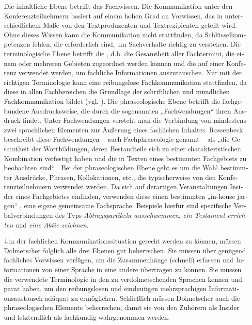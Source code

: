\documentclass[output=paper]{LSP/langsci}
\begin{document}
\begin{otherlanguage}{ngerman}
Die inhaltliche Ebene betrifft das Fachwissen. Die Kommunikation unter den Konferenzteilnehmern basiert auf einem hohen Grad an Vorwissen, das in unterschiedlichem Maße von den Textproduzenten und Textrezipienten geteilt wird. Ohne dieses Wissen kann die Kommunikation nicht stattfinden, da Schlüsselkompetenzen fehlen, die erforderlich sind, um Sachverhalte richtig zu verstehen. Die terminologische Ebene betrifft die , d.h. die Gesamtheit aller Fachtermini, die einem oder mehreren Gebieten zugeordnet werden können und die auf einer Konferenz verwendet werden, um fachliche Informationen auszutauschen. Nur mit der richtigen Terminologie kann eine reibungslose Fachkommunikation stattfinden, da diese in allen Fachbereichen die Grundlage der schriftlichen und mündlichen Fachkommunikation bildet (vgl. \citealt[6]{Arntz2009}). Die phraseologische Ebene betrifft die fachgebundene Ausdrucksweise, die durch die sogenannten „Fachwendungen“ \citep[207]{Picht1990} ihren Ausdruck findet. Unter Fachwendungen versteht man die Verbindung von mindestens zwei sprachlichen Elementen zur Äußerung eines fachlichen Inhaltes. Rossenbeck beschreibt diese Fachwendungen -- auch Fachphraseologie genannt -- als „die Gesamtheit der Wortbildungen, deren Bestandteile sich zu einer charakteristischen Kombination verfestigt haben und die in Texten eines bestimmten Fachgebiets zu beobachten sind“ \citep[199]{Rossenbeck1989}. Bei der phraseologischen Ebene geht es um die Wahl bestimmter Ausdrücke, Phrasen, Kollokationen, etc., die typischerweise von den Konferenzteilnehmern verwendet werden. Da sich auf derartigen Veranstaltungen Insider eines Fachgebietes einfinden, verwenden diese einen bestimmten „in-house jargon“ \citep[777]{Kalina2005}, eine eigene gemeinsame Fachsprache. Beispiele hierfür sind spezifische Verbalverbindungen des Typs \textit{Abtragspartikeln ausschwemmen}, \textit{ein Testament errichten} und \textit{eine Aktie zeichnen}. 

Um der fachlichen Kommunikationssituation gerecht werden zu können, müssen Dolmetscher folglich alle drei Ebenen gut beherrschen. Sie müssen über genügend fachliches Vorwissen verfügen, um die Zusammenhänge (schnell) erfassen und Informationen von einer Sprache in eine andere übertragen zu können. Sie müssen die verwendete Terminologie in den zu verdolmetschenden Sprachen kennen und parat haben, um den reibungslosen und eindeutigen mehrsprachigen Informationsaustausch adäquat zu ermöglichen. Schließlich müssen Dolmetscher auch die phraseologischen Elemente beherrschen, damit sie von den Zuhörern als Insider und letztendlich als fachkundig wahrgenommen werden.


\end{otherlanguage}
\end{document}
